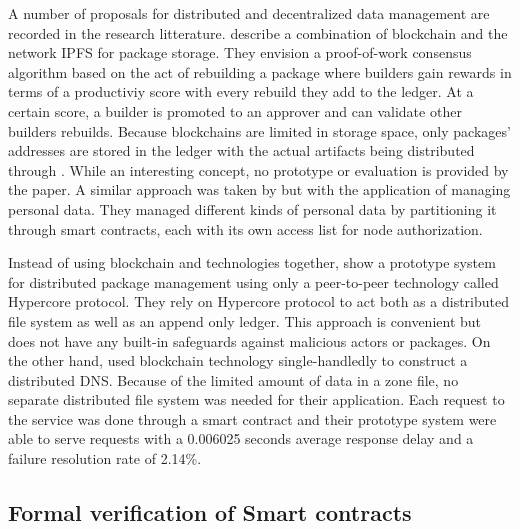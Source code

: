 \documentclass[english, biblatex, digitaloutput]{kththesis}
\begin{document}
A number of proposals for distributed and decentralized data management are recorded in the research litterature. \textcite{ince_blockchain_2020} describe a combination of blockchain and the  network \gls{IPFS} for package storage. They envision a proof-of-work consensus algorithm based on the act of rebuilding a package where builders gain rewards in terms of a productiviy score with every rebuild they add to the ledger. At a certain score, a builder is promoted to an approver and can validate other builders rebuilds. Because blockchains are limited in storage space, only packages' addresses are stored in the ledger with the actual artifacts being distributed through . While an interesting concept, no prototype or evaluation is provided by the paper. A similar approach was taken by \textcite{zichichi_efficiency_2020} but with the application of managing personal data. They managed different kinds of personal data by partitioning it through smart contracts, each with its own access list for node authorization.

Instead of using blockchain and  technologies together, \textcite{blahser_thine_2021} show a prototype system for distributed package management using only a peer-to-peer technology called Hypercore protocol. They rely on Hypercore protocol to act both as a distributed file system as well as an append only ledger. This approach is convenient but does not have any built-in safeguards against malicious actors or packages. On the other hand, \textcite{liu_data_2018} used blockchain technology single-handledly to construct a distributed \gls{DNS}. Because of the limited amount of data in a zone file, no separate distributed file system was needed for their application. Each request to the service was done through a smart contract and their prototype system were able to serve requests with a 0.006025 seconds average response delay and a failure resolution rate of 2.14\%.

\subsection{Formal verification of Smart contracts}
\end{document}
